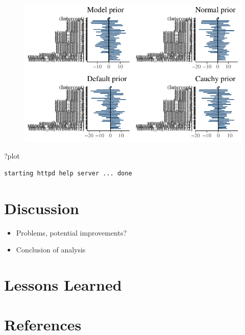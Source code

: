 \documentclass[
  letterpaper,
  DIV=11,
  numbers=noendperiod]{scrartcl}
\newenvironment{Shaded}{\begin{snugshade}}{\end{snugshade}}
\newcommand{\NormalTok}[1]{\textcolor[rgb]{0.00,0.23,0.31}{#1}}
\providecommand{\tightlist}{%
  \setlength{\itemsep}{0pt}\setlength{\parskip}{0pt}}\usepackage{longtable,booktabs,array}
\begin{document}
\begin{figure}[H]

{\centering \includegraphics{project_final_files/figure-pdf/unnamed-chunk-24-1.pdf}

}

\end{figure}

\begin{Shaded}
\begin{Highlighting}[]
\NormalTok{?plot}
\end{Highlighting}
\end{Shaded}

\begin{verbatim}
starting httpd help server ... done
\end{verbatim}

\hypertarget{discussion}{%
\section{Discussion}\label{discussion}}

\begin{itemize}
\tightlist
\item
  Problems, potential improvements?
\item
  Conclusion of analysis
\end{itemize}

\hypertarget{lessons-learned}{%
\section{Lessons Learned}\label{lessons-learned}}

\hypertarget{references}{%
\section{References}\label{references}}
\end{document}
